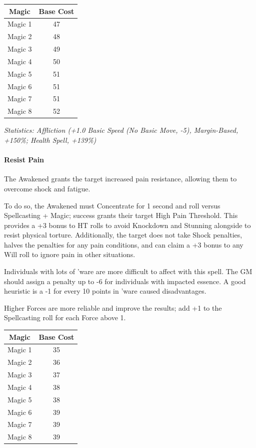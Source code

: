 \begin{multicols*}{3}
	\begin{center}
		\begin{tabular}{|c|c|}
			\hline
			Magic & Base Cost \\
			\hline
			\hline
			Magic 1 & 47 \\
			Magic 2 & 48 \\
			Magic 3 & 49  \\
			Magic 4 & 50 \\
			Magic 5 & 51 \\
			Magic 6 & 51 \\
			Magic 7 & 51 \\
			Magic 8 & 52 \\
			\hline
		\end{tabular}
	\end{center}
	
	\textcolor{OliveGreen}{\textit{Statistics: Affliction (+1.0 Basic Speed (No Basic Move, -5), Margin-Based, +150\%; Health Spell, +139\%) }}
	
	\paragraph{Resist Pain}
	
	The Awakened grants the target increased pain resistance, allowing them to overcome shock and fatigue.
	
	To do so, the Awakened must Concentrate for 1 second and roll versus Spellcasting + Magic; success grants their target High Pain Threshold. This provides a +3 bonus to HT rolls to avoid Knockdown and Stunning alongside to resist physical torture. Additionally, the target does not take Shock penalties, halves the penalties for any pain conditions, and can claim a +3 bonus to any Will roll to ignore pain in other situations.
	
	Individuals with lots of 'ware are more difficult to affect with this spell. The GM should assign a penalty up to -6 for individuals with impacted essence. A good heuristic is a -1 for every 10 points in 'ware caused disadvantages.
	
	Higher Forces are more reliable and improve the results; add +1 to the Spellcasting roll for each Force above 1.
	
	\begin{center}
		\begin{tabular}{|c|c|}
			\hline
			Magic & Base Cost \\
			\hline
			\hline
			Magic 1 & 35 \\
			Magic 2 & 36 \\
			Magic 3 & 37  \\
			Magic 4 & 38 \\
			Magic 5 & 38 \\
			Magic 6 & 39 \\
			Magic 7 & 39 \\
			Magic 8 & 39 \\
			\hline
		\end{tabular}
	\end{center}
		

\end{multicols*}
